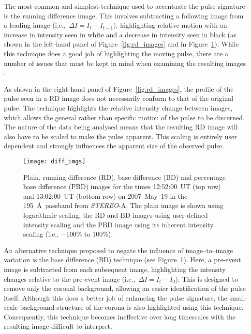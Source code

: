 The most common and simplest technique used to accentuate the pulse signature is the running difference image. This involves subtracting a following image from a leading image (i.e.,\ $\Delta I = I_{t} - I_{t-1}$), highlighting relative motion with an increase in intensity seen in white and a decrease in intensity seen in black (as shown in the left-hand panel of Figure~\ref{fig:rd_images} and in Figure~\ref{fig:diff_imgs}). While this technique does a good job of highlighting the moving pulse, there are a number of issues that must be kept in mind when examining the resulting images \citep[see also][for some additional issues with the misinterpretation of RD images]{Attrill:2010ab}.

As shown in the right-hand panel of Figure~\ref{fig:rd_images}, the profile of the pulse seen in a RD image does not necessarily conform to that of the original pulse. The technique highlights the relative intensity change between images, which allows the general rather than specific motion of the pulse to be discerned. The nature of the data being analysed means that the resulting RD image will also have to be scaled to make the pulse apparent. This scaling is entirely user dependent and strongly influences the apparent size of the observed pulse. 

\begin{figure}[!t]
\begin{center}
\texttt{[image: diff\_imgs]}
\caption{Plain, running difference (RD), base difference (BD) and percentage base difference (PBD) images for the times 12:52:00~UT (top row) and 13:02:00~UT (bottom row) on 2007~May~19 in the 195~\AA\ passband from \emph{STEREO}-A. The plain image is shown using logarithmic scaling, the RD and BD images using user-defined intensity scaling and the PBD image using its inherent intensity  scaling (i.e., $-$100\% to 100\%).}
\label{fig:diff_imgs}
\end{center}
\end{figure}

An alternative technique proposed to negate the influence of image--to--image variation is the base difference (BD) technique (see Figure~\ref{fig:diff_imgs}). Here, a pre-event image is subtracted from each subsequent image, highlighting the intensity changes relative to the pre-event image (i.e.,\ $\Delta I = I_{t} - I_{0}$). This is designed to remove only the coronal background, allowing an easier identification of the pulse itself. Although this does a better job of enhancing the pulse signature, the small-scale background structure of the corona is also highlighted using this technique. Consequently, this technique becomes ineffective over long timescales with the resulting image difficult to interpret.

